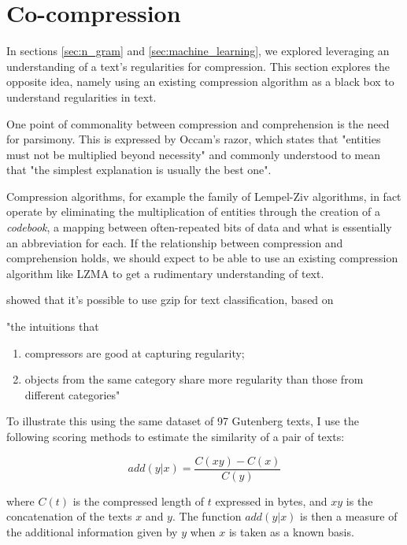 \section{Co-compression}
\label{sec:co_comp}

In sections \ref{sec:n_gram} and \ref{sec:machine_learning}, we explored leveraging an understanding of a text's regularities for compression. This section explores the opposite idea, namely using an existing compression algorithm as a black box to understand regularities in text.

One point of commonality between compression and comprehension is the need for parsimony. This is expressed by Occam's razor, which states that "entities must not be multiplied beyond necessity" and commonly understood to mean that "the simplest explanation is usually the best one".

Compression algorithms, for example the family of Lempel-Ziv algorithms, in fact operate by eliminating the multiplication of entities through the creation of a \emph{codebook}, a mapping between often-repeated bits of data and what is essentially an abbreviation for each. If the relationship between compression and comprehension holds, we should expect to be able to use an existing compression algorithm like LZMA to get a rudimentary understanding of text.

\textcite{Jiang2023} showed that it's possible to use gzip for text classification, based on

\begin{displayquote}
"the intuitions that
\begin{enumerate}
\item compressors are good at capturing regularity; 
\item objects from the same category share more regularity than those from different categories"
\end{enumerate}
\end{displayquote}

To illustrate this using the same dataset of 97 Gutenberg texts, I use the following scoring methods to estimate the similarity of a pair of texts:

\[add(y|x) = \frac{C(xy) - C(x)}{C(y)}\]

where \(C(t)\) is the compressed length of \(t\) expressed in bytes, and \(xy\) is the concatenation of the texts \(x\) and \(y\). The function \(add(y|x)\) is then a measure of the additional information given by \(y\) when \(x\) is taken as a known basis.

